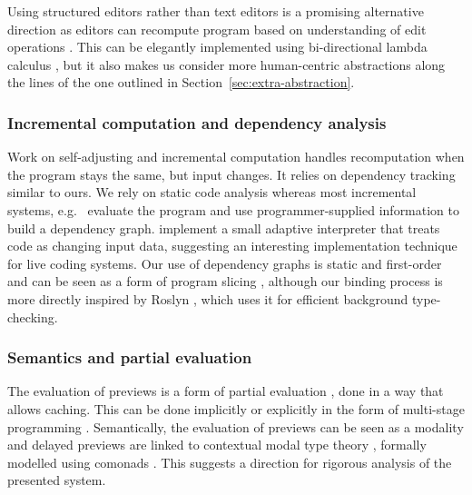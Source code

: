 \documentclass[english,submission]{programming}
\theoremstyle{plain}
\theoremstyle{definition}
\begin{document}
Using structured editors \cite{structure-based} rather than text editors is a promising alternative
direction as editors can recompute program based on understanding of edit operations
\cite{interactive,livenut,lamdu}. This can be elegantly implemented using bi-directional
lambda calculus \cite{hazelnut}, but it also makes us consider more human-centric abstractions
\cite{subtext,directprog} along the lines of the one outlined in Section~\ref{sec:extra-abstraction}.

\subsubsection{Incremental computation and dependency analysis}
Work on self-adjusting and incremental computation \cite{selfadjusting,adapton} handles
recomputation when the program stays the same, but input changes. It relies on dependency tracking
similar to ours. We rely on static code analysis whereas most incremental systems,
e.g.~\cite{incremental,adaptivefp,deltaml} evaluate the program and use programmer-supplied
information to build a dependency graph. \cite{adapton} implement a small adaptive interpreter
that treats code as changing input data, suggesting an interesting implementation technique for
live coding systems. Our use of dependency graphs \cite{dependencies} is static and first-order
and can be seen as a form of program slicing \cite{slicing}, although our binding process is
more directly inspired by Roslyn \cite{roslyn}, which uses it for efficient background type-checking.

\subsubsection{Semantics and partial evaluation}
The evaluation of previews is a form of partial evaluation \cite{partial}, done in a
way that allows caching. This can be done implicitly or explicitly in the form of
multi-stage programming \cite{metaml}. Semantically, the evaluation of previews can be seen as a
modality \cite{modal} and delayed previews are linked to contextual modal type theory \cite{cmtt},
formally modelled using comonads \cite{cmtt-denotation}. This suggests a direction for rigorous
analysis of the presented system.
\end{document}
